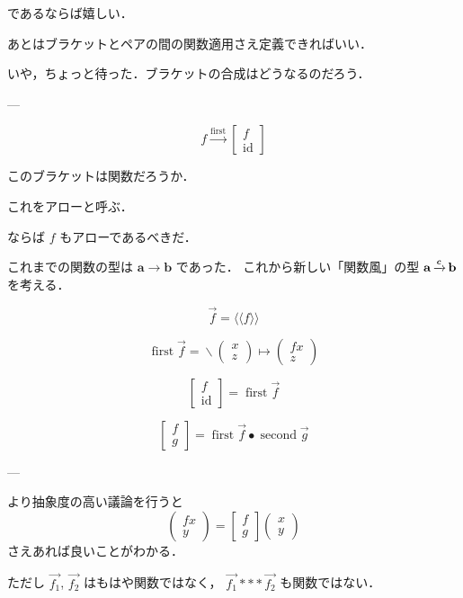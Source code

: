 \documentclass[a5paper,twoside,fleqn,draft]{jsbook}
\def\llangle{\langle\!\langle}
\def\rrangle{\rangle\!\rangle}
\newcommand{\Langle}{\llangle}
\newcommand{\Rangle}{\rrangle}
\newcommand{\mSpecialFunc}[1]{\mathrm{#1}}
\DeclareMathOperator{\mFirst}{\mSpecialFunc{first}}
\DeclareMathOperator{\mId}{\mSpecialFunc{id}}
\DeclareMathOperator{\mSecond}{\mSpecialFunc{second}}
\newcommand{\mCatArrow}[1]{\xrightarrow{#1}}
\DeclareMathOperator{\mCatArrowC}{\mCatArrow{\mPolymorphicTypeParameter{c}}}
\DeclareMathOperator{\mCompCat}{\bullet}
\DeclareMathOperator{\mFuncArrow}{\rightarrow}
\DeclareMathOperator{\mLambda}{\backslash}
\DeclareMathOperator{\mLambdaArrow}{\mapsto}
\newcommand{\mType}[1]{\mathbf{#1}} %
\newcommand{\mPolymorphicTypeParameter}[1]{\textbf{\textit{#1}}}
\newcommand{\mA}{\mType{a}}
\newcommand{\mB}{\mType{b}}
\newcommand{\mArrowWith}[1]{\Langle#1\Rangle}
\newcommand{\mPairWith}[2]{\begin{pmatrix}#1\\#2\end{pmatrix}}
\begin{document}
であるならば嬉しい．

あとはブラケットとペアの間の関数適用さえ定義できればいい．

いや，ちょっと待った．ブラケットの合成はどうなるのだろう．

---

\begin{equation}
  f
  \xrightarrow{\mFirst}
  \begin{bmatrix}
    f\\
    \mId
  \end{bmatrix}
\end{equation}

このブラケットは関数だろうか．

これをアローと呼ぶ．

ならば $f$ もアローであるべきだ．

これまでの関数の型は $\mA\mFuncArrow\mB$ であった．
これから新しい「関数風」の型 $\mA\mCatArrowC\mB$ を考える．

\begin{equation}
  \Vec{f}
  =\mArrowWith{f}
\end{equation}

\begin{equation}
  \mFirst\Vec{f}
  =\mLambda{\mPairWith{x}{z}}\mLambdaArrow\mPairWith{fx}{z}
\end{equation}

\begin{equation}
  \begin{bmatrix}
    f\\
    \mId
  \end{bmatrix}
  =\mFirst\Vec{f}
\end{equation}

\begin{equation}
  \begin{bmatrix}
    f\\g
  \end{bmatrix}
  =\mFirst\Vec{f}\mCompCat\mSecond\Vec{g}
\end{equation}

---

より抽象度の高い議論を行うと
\begin{equation}
  \mPairWith{fx}{y}
  =\begin{bmatrix}f\\g\end{bmatrix}
  \mPairWith{x}{y}
\end{equation}
さえあれば良いことがわかる．


ただし $\Vec{f_1}$, $\Vec{f_2}$ はもはや関数ではなく，
$\Vec{f_1}***\Vec{f_2}$ も関数ではない．
\end{document}

